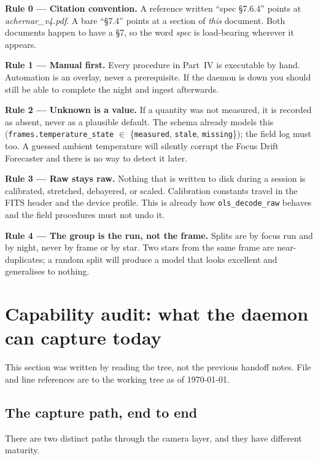 \documentclass[11pt]{article}
\newcommand{\co}[1]{\texttt{\small #1}}
\begin{document}
\begin{keybox}
\textbf{Rule 0 --- Citation convention.} A reference written ``spec \S7.6.4''
points at \emph{achernar\_v4.pdf}. A bare ``\S7.4'' points at a section of
\emph{this} document. Both documents happen to have a \S7, so the word
\emph{spec} is load-bearing wherever it appears.
\end{keybox}

\begin{keybox}
\textbf{Rule 1 --- Manual first.} Every procedure in Part~IV is executable by
hand. Automation is an overlay, never a prerequisite. If the daemon is down you
should still be able to complete the night and ingest afterwards.

\textbf{Rule 2 --- Unknown is a value.} If a quantity was not measured, it is
recorded as absent, never as a plausible default. The schema already models this
(\co{frames.temperature\_state} $\in$ \{\co{measured}, \co{stale},
\co{missing}\}); the field log must too. A guessed ambient temperature will
silently corrupt the Focus Drift Forecaster and there is no way to detect it
later.

\textbf{Rule 3 --- Raw stays raw.} Nothing that is written to disk during a
session is calibrated, stretched, debayered, or scaled. Calibration constants
travel in the FITS header and the device profile. This is already how
\co{ols\_decode\_raw} behaves and the field procedures must not undo it.

\textbf{Rule 4 --- The group is the run, not the frame.} Splits are by focus run
and by night, never by frame or by star. Two stars from the same frame are
near-duplicates; a random split will produce a model that looks excellent and
generalises to nothing.
\end{keybox}

\newpage
\section{Capability audit: what the daemon can capture today}

This section was written by reading the tree, not the previous handoff notes.
File and line references are to the working tree as of \today.

\subsection{The capture path, end to end}

There are two distinct paths through the camera layer, and they have different
maturity.
\end{document}
